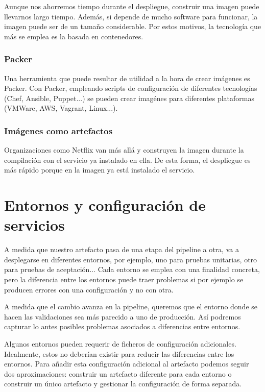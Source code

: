 \documentclass[11pt,a4paper]{article}
\begin{document}
Aunque nos ahorremos tiempo durante el despliegue, construir una imagen puede llevarnos largo tiempo. Además, si depende de mucho software para funcionar, la imagen puede ser de un tamaño considerable. Por estos motivos, la tecnología que más se emplea es la basada en contenedores.

\subsubsection{Packer}

Una herramienta que puede resultar de utilidad a la hora de crear imágenes es Packer. Con Packer, empleando scripts de configuración de diferentes tecnologías (Chef, Ansible, Puppet...) se pueden crear imagénes para diferentes plataformas (VMWare, AWS, Vagrant, Linux...).

\subsubsection{Imágenes como artefactos}

Organizaciones como Netflix van más allá y construyen la imagen durante la compilación con el servicio ya instalado en ella. De esta forma, el despliegue es más rápido porque en la imagen ya está instalado el servicio.

\section{Entornos y configuración de servicios}

A medida que nuestro artefacto pasa de una etapa del pipeline a otra, va a desplegarse en diferentes entornos, por ejemplo, uno para pruebas unitarias, otro para pruebas de aceptación... Cada entorno se emplea con una finalidad concreta, pero la diferencia entre los entornos puede traer problemas si por ejemplo se producen errores con una configuración y no con otra.

A medida que el cambio avanza en la pipeline, queremos que el entorno donde se hacen las validaciones sea más parecido a uno de producción. Así podremos capturar lo antes posibles problemas asociados a diferencias entre entornos.

Algunos entornos pueden requerir de ficheros de configuración adicionales. Idealmente, estos no deberían existir para reducir las diferencias entre los entornos. Para añadir esta configuración adicional al artefacto podemos seguir dos aproximaciones: construir un artefacto diferente para cada entorno o construir un único artefacto y gestionar la configuración de forma separada.
\end{document}
